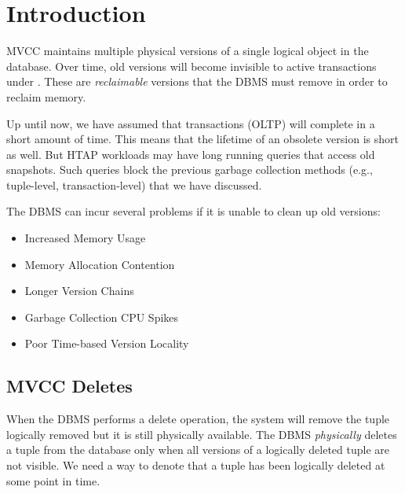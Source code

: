 \documentclass[11pt]{article}
\begin{document}
\maketitle
\thispagestyle{plain}

\section{Introduction}
MVCC maintains multiple physical versions of a single logical object in the database. Over time, old 
versions will become invisible to active transactions under . These 
are \textit{reclaimable} versions that the DBMS must remove in order to reclaim memory.

Up until now, we have assumed that transactions (OLTP) will complete in a short amount of time. This 
means that the lifetime of an obsolete version is short as well. But HTAP workloads may have long 
running queries that access old snapshots. Such queries block the previous garbage collection 
methods (e.g., tuple-level, transaction-level) that we have discussed. 

The DBMS can incur several problems if it is unable to clean up old versions:
\begin{itemize}
    \item Increased Memory Usage
    \item Memory Allocation Contention
    \item Longer Version Chains
    \item Garbage Collection CPU Spikes
    \item Poor Time-based Version Locality
\end{itemize}

\subsection*{MVCC Deletes}
When the DBMS performs a delete operation, the system will remove the tuple logically removed but 
it is still physically available.
The DBMS \textit{physically} deletes a tuple from the database only when all versions of a 
logically deleted tuple are not visible. We need a way to denote that a tuple has been logically 
deleted at some point in time.
\end{document}
